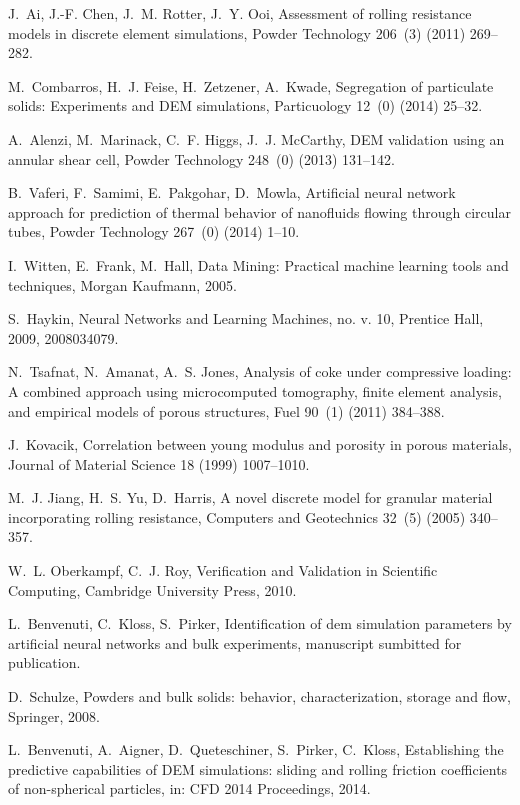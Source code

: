 \documentclass{llncs}
\begin{document}
\begin{thebibliography}{10}
J.~Ai, J.-F. Chen, J.~M. Rotter, J.~Y. Ooi, Assessment of rolling resistance
  models in discrete element simulations, Powder Technology 206~(3) (2011)
  269--282.

M.~Combarros, H.~J. Feise, H.~Zetzener, A.~Kwade, Segregation of particulate
  solids: Experiments and DEM simulations, Particuology 12~(0) (2014) 25--32.

A.~Alenzi, M.~Marinack, C.~F. Higgs, J.~J. McCarthy, DEM validation using an
  annular shear cell, Powder Technology 248~(0) (2013) 131--142.

B.~Vaferi, F.~Samimi, E.~Pakgohar, D.~Mowla, Artificial neural network approach
  for prediction of thermal behavior of nanofluids flowing through circular
  tubes, Powder Technology 267~(0) (2014) 1--10.

I.~Witten, E.~Frank, M.~Hall, Data Mining: Practical machine learning tools and
  techniques, Morgan Kaufmann, 2005.

S.~Haykin, Neural Networks and Learning Machines, no. v. 10, Prentice Hall,
  2009, 2008034079.

N.~Tsafnat, N.~Amanat, A.~S. Jones, Analysis of coke under compressive loading:
  A combined approach using microcomputed tomography, finite element analysis,
  and empirical models of porous structures, Fuel 90~(1) (2011) 384--388.

J.~Kovacik, Correlation between young modulus and porosity in porous materials,
  Journal of Material Science 18 (1999) 1007--1010.

M.~J. Jiang, H.~S. Yu, D.~Harris, A novel discrete model for granular material
  incorporating rolling resistance, Computers and Geotechnics 32~(5) (2005)
  340--357.

W.~L. Oberkampf, C.~J. Roy, Verification and Validation in Scientific
  Computing, Cambridge University Press, 2010.

L.~Benvenuti, C.~Kloss, S.~Pirker, Identification of dem simulation parameters
  by artificial neural networks and bulk experiments, manuscript sumbitted for
  publication.


D.~Schulze, Powders and bulk solids: behavior, characterization, storage and
  flow, Springer, 2008.

L.~Benvenuti, A.~Aigner, D.~Queteschiner, S.~Pirker, C.~Kloss, Establishing the
  predictive capabilities of DEM simulations: sliding and rolling friction
  coefficients of non-spherical particles, in: CFD 2014 Proceedings, 2014.


\end{thebibliography}
\end{document}
